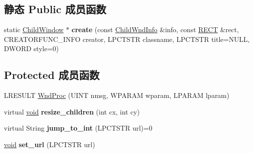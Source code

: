 \subsection*{静态 Public 成员函数}
\begin{DoxyCompactItemize}
\item 
\mbox{\label{struct_child_window_ae87ed7cce62d4f40f05a7155415c71ec}} 
static \hyperlink{struct_child_window}{Child\+Window} $\ast$ {\bfseries create} (const \hyperlink{struct_child_wnd_info}{Child\+Wnd\+Info} \&info, const \hyperlink{structtag_r_e_c_t}{R\+E\+CT} \&rect, C\+R\+E\+A\+T\+O\+R\+F\+U\+N\+C\+\_\+\+I\+N\+FO creator, L\+P\+C\+T\+S\+TR classname, L\+P\+C\+T\+S\+TR title=N\+U\+LL, D\+W\+O\+RD style=0)
\end{DoxyCompactItemize}
\subsection*{Protected 成员函数}
\begin{DoxyCompactItemize}
\item 
L\+R\+E\+S\+U\+LT \hyperlink{struct_child_window_ab3516027124ec7f703d95b54bfdd83c4}{Wnd\+Proc} (U\+I\+NT nmsg, W\+P\+A\+R\+AM wparam, L\+P\+A\+R\+AM lparam)
\item 
\mbox{\label{struct_child_window_ab3fb950753d2cfc800ae72dffdb23cda}} 
virtual \hyperlink{interfacevoid}{void} {\bfseries resize\+\_\+children} (int cx, int cy)
\item 
\mbox{\label{struct_child_window_abadf6e50ed8755713d1a9cae8a35dc9d}} 
virtual String {\bfseries jump\+\_\+to\+\_\+int} (L\+P\+C\+T\+S\+TR url)=0
\item 
\mbox{\label{struct_child_window_ad8603711cbacb6793081b03ce6eeea13}} 
\hyperlink{interfacevoid}{void} {\bfseries set\+\_\+url} (L\+P\+C\+T\+S\+TR url)
\end{DoxyCompactItemize}

